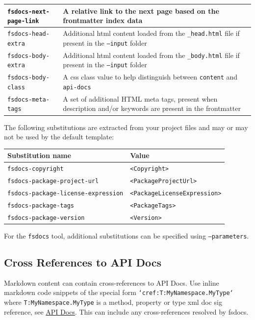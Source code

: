 \documentclass{article}
\begin{document}
\begin{tabular}{|l|l|}
\texttt{fsdocs-next-page-link} & A relative link to the next page based on the frontmatter index data\\ \hline
\texttt{fsdocs-head-extra} & Additional html content loaded from the \texttt{\_head.html} file if present in the \texttt{--input} folder\\ \hline
\texttt{fsdocs-body-extra} & Additional html content loaded from the \texttt{\_body.html} file if present in the \texttt{--input} folder\\ \hline
\texttt{fsdocs-body-class} & A css class value to help distinguish between \texttt{content} and \texttt{api-docs}\\ \hline
\texttt{fsdocs-meta-tags} & A set of additional HTML meta tags, present when description and/or keywords are present in the frontmatter\\ \hline
\end{tabular}



The following substitutions are extracted from your project files and may or may not be used by the default
template:
\begin{tabular}{|l|l|}\hline
\textbf{Substitution name} & \textbf{Value}\\ \hline\hline
\texttt{fsdocs-copyright} & \texttt{<Copyright>}\\ \hline
\texttt{fsdocs-package-project-url} & \texttt{<PackageProjectUrl>}\\ \hline
\texttt{fsdocs-package-license-expression} & \texttt{<PackageLicenseExpression>}\\ \hline
\texttt{fsdocs-package-tags} & \texttt{<PackageTags>}\\ \hline
\texttt{fsdocs-package-version} & \texttt{<Version>}\\ \hline
\end{tabular}



For the \texttt{fsdocs} tool, additional substitutions can be specified using \texttt{--parameters}.
\subsection*{Cross References to API Docs}



Markdown content can contain cross-references to API Docs.  Use inline
markdown code snippets of the special form \texttt{`cref:T:MyNamespace.MyType`} where \texttt{T:MyNamespace.MyType}
is a method, property or type xml doc sig reference, see \href{apidocs.html}{API Docs}.
This can include any cross-references resolved by fsdocs.
\end{document}
